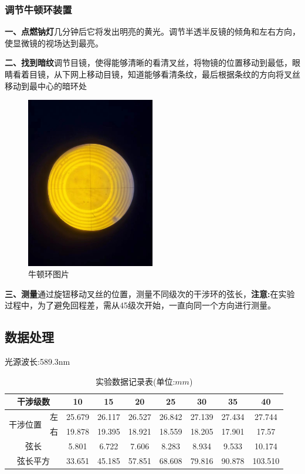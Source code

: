 \documentclass[12pt,a4paper,UTF8]{ctexart}
\begin{document}
\subsubsection*{调节牛顿环装置}
\par \textbf{一、点燃钠灯}\quad 几分钟后它将发出明亮的黄光。调节半透半反镜的倾角和左右方向，使显微镜的视场达到最亮。
\par \textbf{二、找到暗纹}\quad 调节目镜，使得能够清晰的看清叉丝，将物镜的位置移动到最低，眼睛看着目镜，从下网上移动目镜，知道能够看清条纹，最后根据条纹的方向将叉丝移动到最中心的暗环处
\clearpage
\begin{figure}[!htbp]
	\centering
	\includegraphics[width=0.5\textwidth]{牛顿环.jpg}
	\caption*{牛顿环图片}
\end{figure}

\par \textbf{三、测量}\quad 通过旋钮移动叉丝的位置，测量不同级次的干涉环的弦长，\textbf{注意:}在实验过程中，为了避免回程差，需从45级次开始，一直向同一个方向进行测量。
\subsection*{数据处理}
\par 光源波长:589.3nm

\begin{table}[!htbp]
	\centering
	\begin{tabular}{|ccc|c|c|c|c|c|c|c|}
	\hline
	\multicolumn{3}{|c|}{干涉级数}                            & 10     & 15     & 20     & 25     & 30     & 35     & 40      \\ \hline
	\multicolumn{2}{|c|}{\multirow{2}{*}{干涉位置}} & 左       & 25.679 & 26.117 & 26.527 & 26.842 & 27.139 & 27.434 & 27.744  \\ \cline{3-10} 
	\multicolumn{2}{|c|}{}                      & 右       & 19.878 & 19.395 & 18.921 & 18.559 & 18.205 & 17.901 & 17.57   \\ \hline
	\multicolumn{3}{|c|}{弦长}                              & 5.801  & 6.722  & 7.606  & 8.283  & 8.934  & 9.533  & 10.174  \\ \hline
	\multicolumn{3}{|c|}{弦长平方}                            & 33.651 & 45.185 & 57.851 & 68.608 & 79.816 & 90.878 & 103.510 \\ \hline
	\end{tabular}
	\caption{实验数据记录表(单位:$mm$)}
	\end{table}
\end{document}
